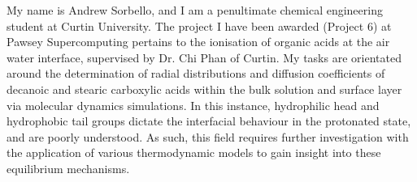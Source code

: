 My name is Andrew Sorbello, and I am a penultimate chemical engineering student at Curtin 
University. The project I have been awarded (Project 6) at Pawsey Supercomputing pertains 
to the ionisation of organic acids at the air water interface, supervised by Dr. Chi Phan of 
Curtin. My tasks are orientated around the determination of radial distributions and 
diffusion coefficients of decanoic and stearic carboxylic acids within the bulk solution and 
surface layer via molecular dynamics simulations. In this instance, hydrophilic head and 
hydrophobic tail groups dictate the interfacial behaviour in the protonated state, and are 
poorly understood. As such, this field requires further investigation with the application of 
various thermodynamic models to gain insight into these equilibrium mechanisms. 
